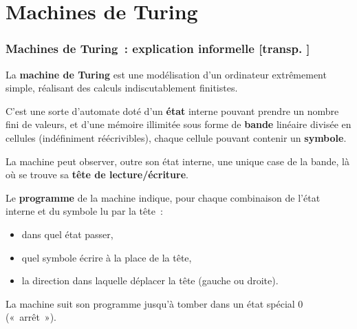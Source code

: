\documentclass[mathserif,a4paper,aspectratio=169]{beamer}
\renewcommand{\frametitle}[1]{\subsubsection*{#1 {\footnotesize[transp. \insertframenumber]}}}
\begin{document}
\section{Machines de Turing}
\begin{frame}
\frametitle{Machines de Turing : explication informelle}

La \textbf{machine de Turing} est une modélisation d'un ordinateur
extrêmement simple, réalisant des calculs indiscutablement finitistes.

\medskip

C'est une sorte d'automate doté d'un \textbf{état} interne pouvant
prendre un nombre fini de valeurs, et d'une mémoire illimitée sous
forme de \textbf{bande} linéaire divisée en cellules (indéfiniment
réécrivibles), chaque cellule pouvant contenir un \textbf{symbole}.

\medskip

La machine peut observer, outre son état interne, une unique case de
la bande, là où se trouve sa \textbf{tête de lecture/écriture}.

\medskip

Le \textbf{programme} de la machine indique, pour chaque combinaison
de l'état interne et du symbole lu par la tête :
\begin{itemize}
\item dans quel état passer,
\item quel symbole écrire à la place de la tête,
\item la direction dans laquelle déplacer la tête (gauche ou droite).
\end{itemize}

\medskip

La machine suit son programme jusqu'à tomber dans un état spécial $0$
(« arrêt »).

\end{frame}
%
\end{document}
